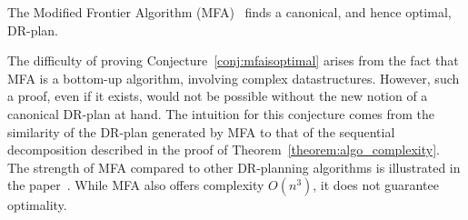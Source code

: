 \begin{conjecture}
\label{conj:mfaisoptimal}
    The Modified Frontier Algorithm (MFA)~\cite{lomonosov2004graph} finds a canonical, and hence optimal, DR-plan.
\end{conjecture}

The difficulty of proving Conjecture~\ref{conj:mfaisoptimal} arises from the fact that MFA is a bottom-up algorithm, involving complex datastructures. However, such a proof, even if it exists, would not be possible without the new notion of a canonical DR-plan at hand. The intuition for this conjecture comes from the similarity of the DR-plan generated by MFA to that of the sequential decomposition described in the proof of Theorem~\ref{theorem:algo_complexity}. The strength of MFA compared to other DR-planning algorithms is illustrated in the paper~\cite{lomonosov2004graph}. While MFA also offers complexity $O(n^3)$, it does not guarantee optimality.
